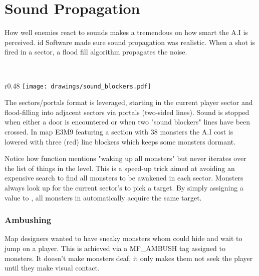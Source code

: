 \section{Sound Propagation}
How well enemies react to sounds makes a tremendous on how smart the A.I is perceived. id Software made sure sound propagation was realistic. When a shot is fired in a sector, a flood fill algorithm propagates the noise.\\
\par
{}\\

\begin{wrapfigure}[10]{r}{0.48\textwidth}
\centering
\texttt{[image: drawings/sound\_blockers.pdf]}
\end{wrapfigure}
  The sectors/portals format is leveraged, starting in the current player sector and flood-filling into adjacent sectors via portals (two-sided lines). Sound is stopped when either a door is encountered or when two "sound blockers" lines have been crossed. In map E3M9 featuring a section with 38 monsters the A.I cost is lowered with three (red) line blockers which keeps some monsters dormant.\\
\par
Notice how function  mentions "waking up all monsters" but never iterates over the list of things in the level. This is a speed-up trick aimed at avoiding an expensive search to find all monsters to be awakened in each sector. Monsters always look up for the current sector's  to pick a target. By simply assigning a value to , all monsters in  automatically acquire the same target.\\
\par
{}
\par
\subsubsection{Ambushing}
Map designers wanted to have sneaky monsters whom could hide and wait to jump on a player. This is achieved via a MF\_AMBUSH tag assigned to monsters. It doesn't make monsters deaf, it only makes them not seek the player until they make visual contact.



